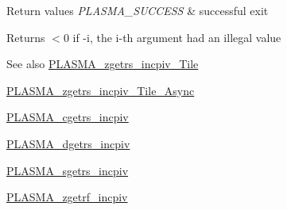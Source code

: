 \begin{DoxyRetVals}{Return values}
{\em P\+L\+A\+S\+M\+A\+\_\+\+S\+U\+C\+C\+E\+S\+S} & successful exit \\
\hline
\end{DoxyRetVals}
\begin{DoxyReturn}{Returns}
$<$0 if -\/i, the i-\/th argument had an illegal value
\end{DoxyReturn}
\begin{DoxySeeAlso}{See also}
\hyperlink{group__PLASMA__Complex64__t__Tile_gab5c4dcbb8ce3878a5ed028a7485c6484_gab5c4dcbb8ce3878a5ed028a7485c6484}{P\+L\+A\+S\+M\+A\+\_\+zgetrs\+\_\+incpiv\+\_\+\+Tile} 

\hyperlink{group__PLASMA__Complex64__t__Tile__Async_ga3af83e90f2792a198a6766a007d11e31_ga3af83e90f2792a198a6766a007d11e31}{P\+L\+A\+S\+M\+A\+\_\+zgetrs\+\_\+incpiv\+\_\+\+Tile\+\_\+\+Async} 

\hyperlink{group__PLASMA__Complex32__t_ga0f056cec00c55830b06c4439d4892165_ga0f056cec00c55830b06c4439d4892165}{P\+L\+A\+S\+M\+A\+\_\+cgetrs\+\_\+incpiv} 

\hyperlink{group__double_ga39d27f0353921e5b63e0fdc9cca4b19c_ga39d27f0353921e5b63e0fdc9cca4b19c}{P\+L\+A\+S\+M\+A\+\_\+dgetrs\+\_\+incpiv} 

\hyperlink{group__float_gae593ed2d7e164acc75c4e6efdca4d95a_gae593ed2d7e164acc75c4e6efdca4d95a}{P\+L\+A\+S\+M\+A\+\_\+sgetrs\+\_\+incpiv} 

\hyperlink{group__PLASMA__Complex64__t_ga085b5e62180512c7c603e72a9092ad8d_ga085b5e62180512c7c603e72a9092ad8d}{P\+L\+A\+S\+M\+A\+\_\+zgetrf\+\_\+incpiv} 
\end{DoxySeeAlso}
\hypertarget{group__PLASMA__Complex64__t_gad148e141c13feede49709370caea9c2a_gad148e141c13feede49709370caea9c2a}{}
